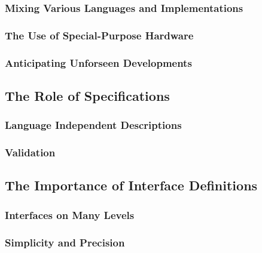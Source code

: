 \documentclass{article}[12pt]
\def\filler{xxxx xxxx xxxx xxxx xxxx xxxx xxxx xxxx xxxx xxxx xxxx xxxx
xxxx xxxx xxxx xxxx xxxx xxxx xxxx xxxx xxxx xxxx xxxx xxxx
xxxx xxxx xxxx xxxx xxxx xxxx xxxx xxxx xxxx xxxx xxxx xxxx
xxxx xxxx xxxx xxxx xxxx xxxx xxxx xxxx xxxx xxxx xxxx xxxx
xxxx xxxx xxxx xxxx xxxx xxxx xxxx xxxx xxxx xxxx xxxx xxxx
xxxx xxxx xxxx xxxx xxxx xxxx xxxx xxxx xxxx xxxx xxxx xxxx
xxxx xxxx xxxx xxxx xxxx xxxx xxxx xxxx xxxx xxxx xxxx xxxx
xxxx xxxx xxxx xxxx xxxx xxxx xxxx xxxx xxxx xxxx xxxx xxxx}
\def\filler{}
\begin{document}
\filler

\subsubsection{Mixing Various Languages and Implementations}

\filler

\subsubsection{The Use of Special-Purpose Hardware}

\filler

\subsubsection{Anticipating Unforseen Developments}

\filler

\subsection{The Role of Specifications}

\filler

\subsubsection{Language Independent Descriptions}

\filler

\subsubsection{Validation}

\filler

\subsection{The Importance of Interface Definitions}

\filler

\subsubsection{Interfaces on Many Levels}

\filler

\subsubsection{Simplicity and Precision}
\end{document}
